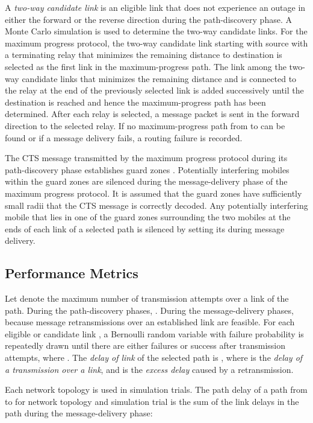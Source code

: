 \documentclass[conference]{IEEEtran}
\begin{document}
A \emph{two-way candidate link}
is an eligible link that does
not experience an outage in either the forward or the
reverse direction during the path-discovery phase. A
Monte Carlo simulation is used to determine the two-way
candidate links. For the maximum progress protocol, the
two-way candidate link starting with source
 with a terminating relay that minimizes the remaining distance
to destination 
is selected as the first link in the
maximum-progress path. The link among the two-way
candidate links that minimizes the remaining distance
and is connected to the relay at the end of the previously
selected link is added successively until the destination
 is reached and hence the maximum-progress path
has been determined. After each relay is selected, a
message packet is sent in the forward direction to the
selected relay. If no maximum-progress path from
 to  can be found or if a message delivery fails, a
routing failure is recorded.

The CTS message transmitted by the maximum
progress protocol during its path-discovery phase establishes guard zones \cite{tor1}. Potentially interfering mobiles
within the guard zones are silenced during the message-delivery phase of the maximum progress protocol. It is assumed that the guard zones have sufficiently small radii
 that the CTS message is correctly decoded. Any
potentially interfering mobile 
that lies in one of the guard zones surrounding the two mobiles at the ends of each link of a selected path is silenced by setting its
 during message delivery.



\subsection{Performance Metrics}

Let  denote the maximum number of transmission
attempts over a link of the path. During the path-discovery phases, . During the message-delivery phases,  because message retransmissions over an established link are feasible. For each eligible or
candidate link , a Bernoulli random variable
with failure probability 
is repeatedly drawn until there
are either  failures or success after
 transmission attempts, where . The
\emph{delay of link}
 of the
selected path is , where 
is the \emph{delay of a transmission over a link}, and
 is the \emph{excess delay} caused by a retransmission.


Each network topology  is used in  simulation trials. The
path delay  of a path from
 to  for network topology 
and simulation trial  is the sum
of the link delays in the path during the message-delivery
phase:
\end{document}
